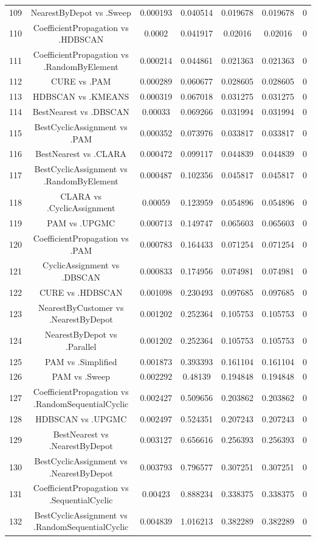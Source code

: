 \documentclass[a4paper,10pt]{article}
\begin{document}
\begin{landscape}
\begin{table}[!htp]
\begin{tabular}{ccccccc}
109&NearestByDepot vs .Sweep&0.000193&0.040514&0.019678&0.019678&0\\
110&CoefficientPropagation vs .HDBSCAN&0.0002&0.041917&0.02016&0.02016&0\\
111&CoefficientPropagation vs .RandomByElement&0.000214&0.044861&0.021363&0.021363&0\\
112&CURE vs .PAM&0.000289&0.060677&0.028605&0.028605&0\\
113&HDBSCAN vs .KMEANS&0.000319&0.067018&0.031275&0.031275&0\\
114&BestNearest vs .DBSCAN&0.00033&0.069266&0.031994&0.031994&0\\
115&BestCyclicAssignment vs .PAM&0.000352&0.073976&0.033817&0.033817&0\\
116&BestNearest vs .CLARA&0.000472&0.099117&0.044839&0.044839&0\\
117&BestCyclicAssignment vs .RandomByElement&0.000487&0.102356&0.045817&0.045817&0\\
118&CLARA vs .CyclicAssignment&0.00059&0.123959&0.054896&0.054896&0\\
119&PAM vs .UPGMC&0.000713&0.149747&0.065603&0.065603&0\\
120&CoefficientPropagation vs .PAM&0.000783&0.164433&0.071254&0.071254&0\\
121&CyclicAssignment vs .DBSCAN&0.000833&0.174956&0.074981&0.074981&0\\
122&CURE vs .HDBSCAN&0.001098&0.230493&0.097685&0.097685&0\\
123&NearestByCustomer vs .NearestByDepot&0.001202&0.252364&0.105753&0.105753&0\\
124&NearestByDepot vs .Parallel&0.001202&0.252364&0.105753&0.105753&0\\
125&PAM vs .Simplified&0.001873&0.393393&0.161104&0.161104&0\\
126&PAM vs .Sweep&0.002292&0.48139&0.194848&0.194848&0\\
127&CoefficientPropagation vs .RandomSequentialCyclic&0.002427&0.509656&0.203862&0.203862&0\\
128&HDBSCAN vs .UPGMC&0.002497&0.524351&0.207243&0.207243&0\\
129&BestNearest vs .NearestByDepot&0.003127&0.656616&0.256393&0.256393&0\\
130&BestCyclicAssignment vs .NearestByDepot&0.003793&0.796577&0.307251&0.307251&0\\
131&CoefficientPropagation vs .SequentialCyclic&0.00423&0.888234&0.338375&0.338375&0\\
132&BestCyclicAssignment vs .RandomSequentialCyclic&0.004839&1.016213&0.382289&0.382289&0\\

\end{tabular}
\end{table}
\end{landscape}
\end{document}

